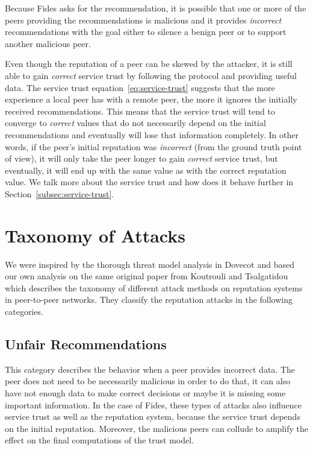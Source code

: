 Because Fides asks for the recommendation, it is possible that one or more of the peers providing the recommendations is malicious and it provides \textit{incorrect} recommendations with the goal either to silence a benign peer or to support another malicious peer.

Even though the reputation of a peer can be skewed by the attacker, it is still able to gain \textit{correct} service trust by following the protocol and providing useful data.
The service trust equation~\ref{eq:service-trust} suggests that the more experience a local peer has with a remote peer, the more it ignores the initially received recommendations.
This means that the service trust will tend to converge to \textit{correct} values that do not necessarily depend on the initial recommendations and eventually will lose that information completely.
In other words, if the peer's initial reputation was \textit{incorrect} (from the ground truth point of view), it will only take the peer longer to gain \textit{correct} service trust, but eventually, it will end up with the same value as with the correct reputation value.
We talk more about the service trust and how does it behave further in Section~\ref{subsec:service-trust}.

\section{Taxonomy of Attacks}
\label{sec:taxonomy-of-attacks}
We were inspired by the thorough threat model analysis in Dovecot \cite{dita}  and based our own analysis on the same original paper from Koutrouli and Tsalgatidou \cite{KOUTROULI201247} which describes the taxonomy of different attack methods on reputation systems in peer-to-peer networks.
They classify the reputation attacks in the following categories.

\subsection{Unfair Recommendations}
\label{subsec:unfair-recommendations}
This category describes the behavior when a peer provides incorrect data.
The peer does not need to be necessarily malicious in order to do that, it can also have not enough data to make correct decisions or maybe it is missing some important information.
In the case of Fides, these types of attacks also influence service trust as well as the reputation system, because the service trust depends on the initial reputation.
Moreover, the malicious peers can collude to amplify the effect on the final computations of the trust model.

